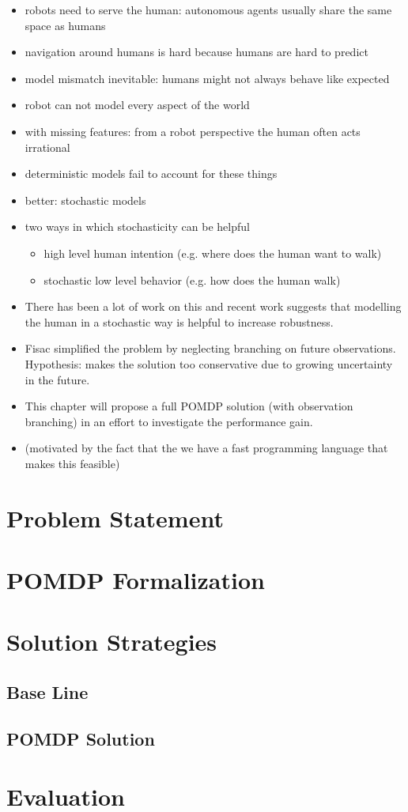 \begin{itemize}
  \item robots need to serve the human: autonomous agents usually share the same space as humans
  \item navigation around humans is hard because humans are hard to predict
  \item model mismatch inevitable: humans might not always behave like expected
  \item robot can not model every aspect of the world
  \item with missing features: from a robot perspective the human often acts irrational
  \item deterministic models fail to account for these things
  \item better: stochastic models
  \item two ways in which stochasticity can be helpful
  \begin{itemize}
    \item high level human intention (e.g. where does the human want to walk)
    \item stochastic low level behavior (e.g. how does the human walk)
  \end{itemize}
  \item There has been a lot of work on this and recent work suggests that modelling the human in a stochastic way is helpful to increase robustness. \cite{fisac2018probabilistically}
  \item Fisac simplified the problem by neglecting branching on future observations. Hypothesis: makes the solution too conservative due to growing uncertainty in the future.
  \item This chapter will propose a full POMDP solution (with observation branching) in an effort to investigate the performance gain.
  \item (motivated by the fact that the we have a fast programming language that makes this feasible)
\end{itemize}

\section{Problem Statement}\label{sec:hri-problem-statement}
\section{POMDP Formalization}\label{sec:hri-pomdp-formalization}
\section{Solution Strategies}\label{sec:hri-solutions}
\subsection{Base Line}\label{sec:hri-base-line}
\subsection{POMDP Solution}\label{sec:hri-planners}
\section{Evaluation}\label{sec:hri-evaluation}
